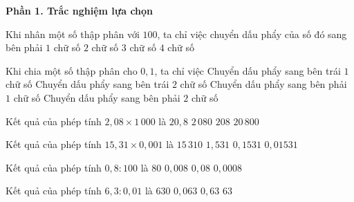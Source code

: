\textbf{Phần 1. Trắc nghiệm lựa chọn}

\begin{ex} %
Khi nhân một số thập phân với $100$, ta chỉ việc chuyển dấu phẩy của số đó sang bên phải
\choice
{$1$ chữ số}
{\True $2$ chữ số}
{$3$ chữ số}
{$4$ chữ số}
\end{ex}

\begin{ex} %
Khi chia một số thập phân cho $0{,}1$, ta chỉ việc
\choice
{Chuyển dấu phẩy sang bên trái $1$ chữ số}
{Chuyển dấu phẩy sang bên trái $2$ chữ số}
{\True Chuyển dấu phẩy sang bên phải $1$ chữ số}
{Chuyển dấu phẩy sang bên phải $2$ chữ số}
\end{ex}

\begin{ex} %
Kết quả của phép tính $2{,}08 \times 1\,000$ là
\choice
{$20{,}8$}
{\True $2\,080$}
{$208$}
{$20\,800$}
\end{ex}

\begin{ex} %
Kết quả của phép tính $15{,}31 \times 0{,}001$ là
\choice
{$15\,310$}
{$1{,}531$}
{$0{,}1531$}
{\True $0{,}01531$}
\end{ex}

\begin{ex} %
Kết quả của phép tính $0{,}8 : 100$ là
\choice
{$80$}
{\True $0{,}008$}
{$0{,}08$}
{$0{,}0008$}
\end{ex}

\begin{ex} %
Kết quả của phép tính $6{,}3 : 0{,}01$ là
\choice
{\True $630$}
{$0{,}063$}
{$0{,}63$}
{$63$}
\end{ex}

